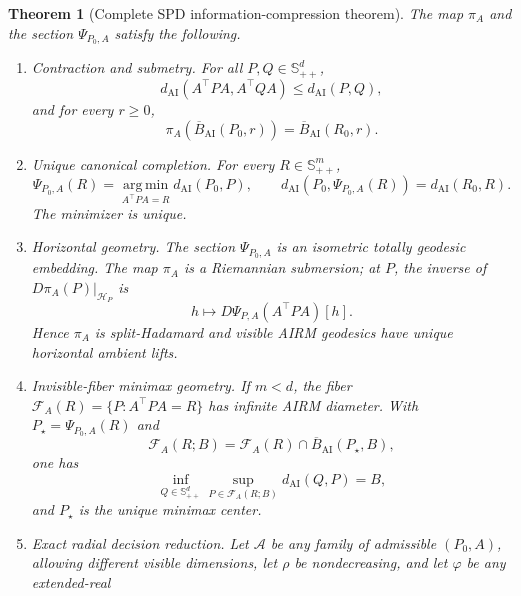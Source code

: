 \documentclass[10pt]{article}
\theoremstyle{plain}
\newtheorem{theorem}{Theorem}[section]
\theoremstyle{definition}
\theoremstyle{remark}
\newcommand{\SPD}{\mathbb S_{++}}
\newcommand{\AI}{\mathrm{AI}}
\newcommand{\argminop}{\operatorname*{arg\,min}}
\newcommand{\dai}{d_{\AI}}
\begin{document}
\begin{theorem}[Complete SPD information-compression theorem]
\label{thm:spd-compression}
The map \(\pi_A\) and the section \(\Psi_{P_0,A}\) satisfy the following.
\begin{enumerate}[label=(\Alph*),leftmargin=*]
  \item \emph{Contraction and submetry.}  For all \(P,Q\in\SPD^d\),
  \begin{equation}
    \dai(A^\top PA,A^\top QA)\le\dai(P,Q),
    \label{eq:spd-contraction}
  \end{equation}
  and for every \(r\ge0\),
  \begin{equation}
    \pi_A(\overline B_{\AI}(P_0,r))
    =\overline B_{\AI}(R_0,r).
    \label{eq:spd-ball-submetry}
  \end{equation}
  \item \emph{Unique canonical completion.}  For every \(R\in\SPD^m\),
  \begin{equation}
    \boxed{
    \Psi_{P_0,A}(R)
    =\argminop_{A^\top PA=R}\dai(P_0,P),
    \qquad
    \dai(P_0,\Psi_{P_0,A}(R))=\dai(R_0,R).}
    \label{eq:spd-shortest-completion}
  \end{equation}
  The minimizer is unique.
  \item \emph{Horizontal geometry.}  The section \(\Psi_{P_0,A}\) is an
  isometric totally geodesic embedding.  The map \(\pi_A\) is a Riemannian
  submersion; at \(P\), the inverse of
  \(D\pi_A(P)|_{\mathcal H_P}\) is
  \begin{equation}
    h\longmapsto D\Psi_{P,A}(A^\top PA)[h].
    \label{eq:spd-horizontal-lift}
  \end{equation}
  Hence \(\pi_A\) is split-Hadamard and visible AIRM geodesics have unique
  horizontal ambient lifts.
  \item \emph{Invisible-fiber minimax geometry.}  If \(m<d\), the fiber
  \(\mathcal F_A(R)=\{P:A^\top PA=R\}\) has infinite AIRM diameter.  With
  \(P_\star=\Psi_{P_0,A}(R)\) and
  \[
    \mathcal F_A(R;B)
    =\mathcal F_A(R)\cap\overline B_{\AI}(P_\star,B),
  \]
  one has
  \begin{equation}
    \inf_{Q\in\SPD^d}\sup_{P\in\mathcal F_A(R;B)}\dai(Q,P)=B,
    \label{eq:spd-minimax}
  \end{equation}
  and \(P_\star\) is the unique minimax center.
  \item \emph{Exact radial decision reduction.}  Let \(\mathcal A\) be any
  family of admissible \((P_0,A)\), allowing different visible dimensions,
  let \(\rho\) be nondecreasing, and let \(\varphi\) be any extended-real

\end{enumerate}
\end{theorem}
\end{document}
